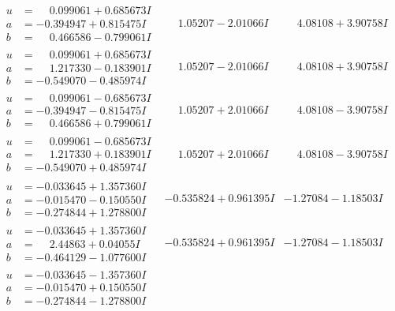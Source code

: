 \documentclass[1p]{elsarticle_modified}
\theoremstyle{definition}
\begin{document}
$$\begin{array}{c|c|c}
\begin{aligned}
u &= \phantom{-}0.099061 + 0.685673 I \\
a &= -0.394947 + 0.815475 I \\
b &= \phantom{-}0.466586 - 0.799061 I\end{aligned}
 & \phantom{-}1.05207 - 2.01066 I & \phantom{-}4.08108 + 3.90758 I \\ \hline\begin{aligned}
u &= \phantom{-}0.099061 + 0.685673 I \\
a &= \phantom{-}1.217330 - 0.183901 I \\
b &= -0.549070 - 0.485974 I\end{aligned}
 & \phantom{-}1.05207 - 2.01066 I & \phantom{-}4.08108 + 3.90758 I \\ \hline\begin{aligned}
u &= \phantom{-}0.099061 - 0.685673 I \\
a &= -0.394947 - 0.815475 I \\
b &= \phantom{-}0.466586 + 0.799061 I\end{aligned}
 & \phantom{-}1.05207 + 2.01066 I & \phantom{-}4.08108 - 3.90758 I \\ \hline\begin{aligned}
u &= \phantom{-}0.099061 - 0.685673 I \\
a &= \phantom{-}1.217330 + 0.183901 I \\
b &= -0.549070 + 0.485974 I\end{aligned}
 & \phantom{-}1.05207 + 2.01066 I & \phantom{-}4.08108 - 3.90758 I \\ \hline\begin{aligned}
u &= -0.033645 + 1.357360 I \\
a &= -0.015470 - 0.150550 I \\
b &= -0.274844 + 1.278800 I\end{aligned}
 & -0.535824 + 0.961395 I & -1.27084 - 1.18503 I \\ \hline\begin{aligned}
u &= -0.033645 + 1.357360 I \\
a &= \phantom{-}2.44863 + 0.04055 I \\
b &= -0.464129 - 1.077600 I\end{aligned}
 & -0.535824 + 0.961395 I & -1.27084 - 1.18503 I \\ \hline\begin{aligned}
u &= -0.033645 - 1.357360 I \\
a &= -0.015470 + 0.150550 I \\
b &= -0.274844 - 1.278800 I\end{aligned}

\end{array}$$
\end{document}
